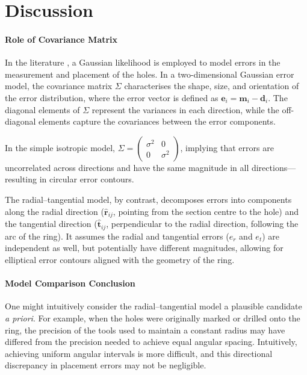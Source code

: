 \documentclass[11pt]{article}
\begin{document}
\section{Discussion}

\paragraph{Role of Covariance Matrix}
In the literature \cite{woan2024improvedcalendarringholecount}, a Gaussian likelihood is employed to model errors in the measurement and placement of the holes. In a two-dimensional Gaussian error model, the covariance matrix $\Sigma$ characterises the shape, size, and orientation of the error distribution, where the error vector is defined as $\mathbf{e}_i = \mathbf{m}_i - \mathbf{d}_i$. The diagonal elements of $\Sigma$ represent the variances in each direction, while the off-diagonal elements capture the covariances between the error components.

In the simple isotropic model, $\Sigma = \begin{pmatrix} \sigma^2 & 0 \\ 0 & \sigma^2 \end{pmatrix}$, implying that errors are uncorrelated across directions and have the same magnitude in all directions—resulting in circular error contours.

The radial–tangential model, by contrast, decomposes errors into components along the radial direction ($\hat{\mathbf{r}}_{ij}$, pointing from the section centre to the hole) and the tangential direction ($\hat{\mathbf{t}}_{ij}$, perpendicular to the radial direction, following the arc of the ring). It assumes the radial and tangential errors ($e_r$ and $e_t$) are independent as well, but potentially have different magnitudes, allowing for elliptical error contours aligned with the geometry of the ring.


\paragraph{Model Comparison Conclusion}

One might intuitively consider the radial–tangential model a plausible candidate \textit{a priori}. For example, when the holes were originally marked or drilled onto the ring, the precision of the tools used to maintain a constant radius may have differed from the precision needed to achieve equal angular spacing. Intuitively, achieving uniform angular intervals is more difficult, and this directional discrepancy in placement errors may not be negligible.
\end{document}

